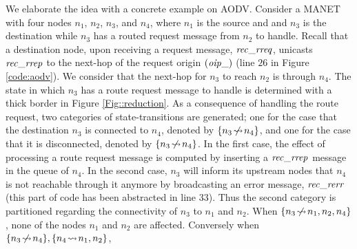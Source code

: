 We elaborate the idea with a concrete example on AODV. Consider a MANET with four nodes $n_1$, $n_2$, $n_3$, and $n_4$, where $n_1$ is the source and and $n_3$ is the destination while $n_3$ has a routed request message from $n_2$ to handle. %
Recall that a destination node, upon receiving a request message, ${\it rec\_rreq}$, unicasts ${\it rec\_rrep}$ to the next-hop of the request origin  
$({\it oip\_})$ (line $26$ in Figure \ref{code:aodv}). We consider that the next-hop for $n_3$ to reach $n_2$ is through $n_4$. The state in which $n_3$ has a route request message to handle is determined with a thick border in Figure \ref{Fig::reduction}. As a consequence of handling the route request, two categories of state-transitions are generated; one for the case that the destination $n_3$ is connected to $n_4$, denoted by $\{n_3\!\mathrel{\hspace{.1em}\not\hspace{-.1em}\rightsquigarrow}\! n_4\}$, and one for the case that it is disconnected, denoted by $\{n_3\!\mathrel{\hspace{.1em}\not\hspace{-.1em}\rightsquigarrow}\! n_4\}$. In the first case, %
the effect of processing a route request message is computed by inserting a ${\it rec\_rrep}$ message in the queue of $n_4$. In the second case, $n_3$ will inform its upstream nodes that $n_4$ is not reachable through it anymore by broadcasting an error message, ${\it rec\_rerr}$ (this part of code has been abstracted in line $33$). %
Thus the second category is partitioned regarding the connectivity of $n_3$ to $n_1$ and $n_2$. When $\{n_3\!\mathrel{\hspace{.1em}\not\hspace{-.1em}\rightsquigarrow}\! n_1,n_2,n_4\}$, %
none of the nodes $n_1$ and $n_2$ are affected. Conversely when $\{n_3\!\mathrel{\hspace{.1em}\not\hspace{-.1em}\rightsquigarrow}\! n_4\},\{n_4\!\rightsquigarrow\! n_1,n_2\}$, %
